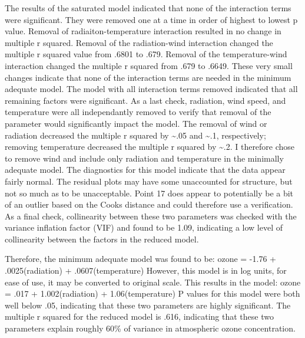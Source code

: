 \documentclass[]{article}
\newenvironment{Shaded}{\begin{snugshade}}{\end{snugshade}}
\newcommand{\KeywordTok}[1]{\textcolor[rgb]{0.13,0.29,0.53}{\textbf{#1}}}
\newcommand{\DataTypeTok}[1]{\textcolor[rgb]{0.13,0.29,0.53}{#1}}
\newcommand{\DecValTok}[1]{\textcolor[rgb]{0.00,0.00,0.81}{#1}}
\newcommand{\StringTok}[1]{\textcolor[rgb]{0.31,0.60,0.02}{#1}}
\newcommand{\OperatorTok}[1]{\textcolor[rgb]{0.81,0.36,0.00}{\textbf{#1}}}
\newcommand{\NormalTok}[1]{#1}
\begin{document}
The results of the saturated model indicated that none of the
interaction terms were significant. They were removed one at a time in
order of highest to lowest p value. Removal of radiaiton-temperature
interaction resulted in no change in multiple r squared. Removal of the
radiation-wind interaction changed the multiple r squared value from
.6801 to .679. Removal of the temperature-wind interaction changed the
multiple r squared from .679 to .6649. These very small changes indicate
that none of the interaction terms are needed in the minimum adequate
model. The model with all interaction terms removed indicated that all
remaining factors were significant. As a last check, radiation, wind
speed, and temperature were all independantly removed to verify that
removal of the parameter would significantly impact the model. The
removal of wind or radiation decreased the multiple r squared by
\textasciitilde{}.05 and \textasciitilde{}.1, respectively; removing
temperature decreased the multiple r squared by \textasciitilde{}.2. I
therefore chose to remove wind and include only radiation and
temperature in the minimally adequate model. The diagnostics for this
model indicate that the data appear fairly normal. The residual plots
may have some unaccounted for structure, but not so much as to be
unacceptable. Point 17 does appear to potentially be a bit of an outlier
based on the Cooks distance and could therefore use a verification. As a
final check, collinearity between these two parameters was checked with
the variance inflation factor (VIF) and found to be 1.09, indicating a
low level of collinearity between the factors in the reduced model.

Therefore, the minimum adequate model was found to be: ozone = -1.76 +
.0025(radiation) + .0607(temperature) However, this model is in log
units, for ease of use, it may be converted to original scale. This
results in the model: ozone = .017 + 1.002(radiation) +
1.06(temperature) P values for this model were both well below .05,
indicating that these two parameters are highly significant. The
multiple r squared for the reduced model is .616, indicating that these
two parameters explain roughly 60\% of variance in atmospheric ozone
concentration.

\begin{Shaded}
\end{Shaded}
\end{document}
